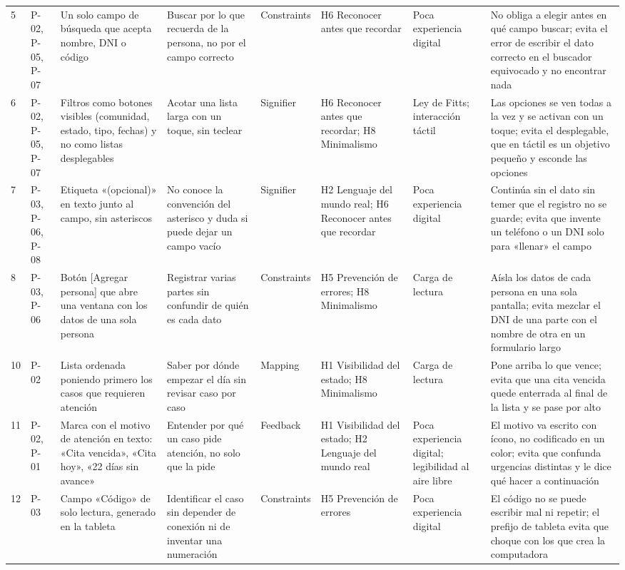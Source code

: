 \begin{longtable}{@{}p{0.6cm}p{1.5cm}p{3.6cm}p{3.4cm}p{2.2cm}p{2.8cm}p{2.3cm}p{4.6cm}@{}}
5 & P-02, P-05, P-07 & Un solo campo de búsqueda que acepta nombre, DNI o código & Buscar por lo que recuerda de la persona, no por el campo correcto & Constraints & H6 Reconocer antes que recordar & Poca experiencia digital & No obliga a elegir antes en qué campo buscar; evita el error de escribir el dato correcto en el buscador equivocado y no encontrar nada \\
6 & P-02, P-05, P-07 & Filtros como botones visibles (comunidad, estado, tipo, fechas) y no como listas desplegables & Acotar una lista larga con un toque, sin teclear & Signifier & H6 Reconocer antes que recordar; H8 Minimalismo & Ley de Fitts; interacción táctil & Las opciones se ven todas a la vez y se activan con un toque; evita el desplegable, que en táctil es un objetivo pequeño y esconde las opciones \\
7 & P-03, P-06, P-08 & Etiqueta «(opcional)» en texto junto al campo, sin asteriscos & No conoce la convención del asterisco y duda si puede dejar un campo vacío & Signifier & H2 Lenguaje del mundo real; H6 Reconocer antes que recordar & Poca experiencia digital & Continúa sin el dato sin temer que el registro no se guarde; evita que invente un teléfono o un DNI solo para «llenar» el campo \\
8 & P-03, P-06 & Botón [Agregar persona] que abre una ventana con los datos de una sola persona & Registrar varias partes sin confundir de quién es cada dato & Constraints & H5 Prevención de errores; H8 Minimalismo & Carga de lectura & Aísla los datos de cada persona en una sola pantalla; evita mezclar el DNI de una parte con el nombre de otra en un formulario largo \\
10 & P-02 & Lista ordenada poniendo primero los casos que requieren atención & Saber por dónde empezar el día sin revisar caso por caso & Mapping & H1 Visibilidad del estado; H8 Minimalismo & Carga de lectura & Pone arriba lo que vence; evita que una cita vencida quede enterrada al final de la lista y se pase por alto \\
11 & P-02, P-01 & Marca con el motivo de atención en texto: «Cita vencida», «Cita hoy», «22 días sin avance» & Entender por qué un caso pide atención, no solo que la pide & Feedback & H1 Visibilidad del estado; H2 Lenguaje del mundo real & Poca experiencia digital; legibilidad al aire libre & El motivo va escrito con ícono, no codificado en un color; evita que confunda urgencias distintas y le dice qué hacer a continuación \\
12 & P-03 & Campo «Código» de solo lectura, generado en la tableta & Identificar el caso sin depender de conexión ni de inventar una numeración & Constraints & H5 Prevención de errores & Poca experiencia digital & El código no se puede escribir mal ni repetir; el prefijo de tableta evita que choque con los que crea la computadora \\

\end{longtable}
